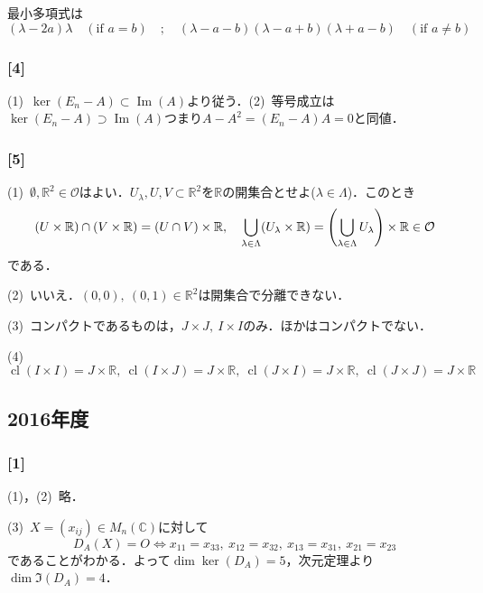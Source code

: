 \documentclass[a4j]{ltjsarticle}
\newcommand{\Rset}{\mathbb{R}}
\newcommand{\Cset}{\mathbb{C}}
\newcommand{\1}{\mathbbm{1}}
\numberwithin{equation}{section}
\theoremstyle{definition}
\begin{document}
最小多項式は
\begin{equation}
    (\lambda-2a)\lambda\quad (\text{if $a=b$})\quad ; \quad (\lambda-a-b)(\lambda-a+b)(\lambda+a-b) \quad (\text{if $a\neq b$})
\end{equation}
\subsubsection*{[4]}
(1)\ $\ker(E_n-A)\subset \mathop{\text{Im}}(A)$より従う．(2)\ 等号成立は$\ker(E_n-A)\supset \mathop{\text{Im}}(A)$つまり$A-A^2=(E_n-A)A=0$と同値．
\subsubsection*{[5]}
(1)\ $\emptyset,\Rset^2\in\mathcal{O}$はよい．$U_\lambda,U,V\subset \Rset^2$を$\Rset$の開集合とせよ($\lambda\in\Lambda$)．このとき
\begin{equation}
    (U\times \Rset)\cap (V\times \Rset)=(U\cap V)\times \Rset,\quad \bigcup_{\lambda\in\Lambda}(U_\lambda\times \Rset)=\qty(\bigcup_{\lambda\in\Lambda}U_{\lambda})\times \Rset\in\mathcal{O}
\end{equation}
である．

(2)\ いいえ．$(0,0),\ (0,1)\in\Rset^2$は開集合で分離できない．

(3)\ コンパクトであるものは，$J\times J,\ I\times I$のみ．ほかはコンパクトでない．

(4)\ $\mathop{\text{cl}}(I\times I)=J\times \Rset,\ \mathop{\text{cl}}(I\times J)=J\times \Rset,\ \mathop{\text{cl}}(J\times I)=J\times \Rset,\ \mathop{\text{cl}}(J\times J)=J\times \Rset$
\subsection{2016年度}
\subsubsection*{[1]}
(1)，(2)\ 略．

(3)\ $X=(x_{ij})\in M_n(\Cset)$に対して
\begin{equation}
    D_A(X)=O\iff x_{11}=x_{33},\ x_{12}=x_{32},\ x_{13}=x_{31},\ x_{21}=x_{23}
\end{equation}
であることがわかる．よって$\dim \ker(D_A)=5$，次元定理より$\dim \Im(D_A)=4$．
\end{document}
